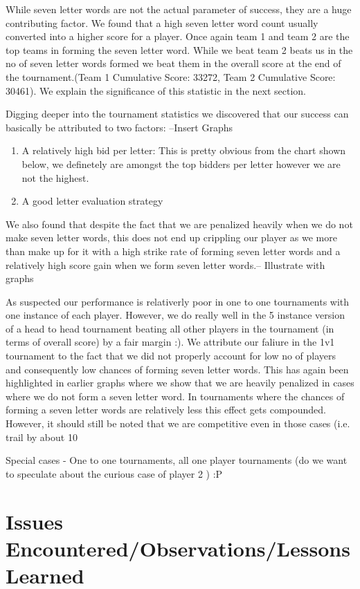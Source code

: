 \documentclass[11pt]{article}
\begin{document}
	While seven letter words are not the actual parameter of success, they are a huge contributing factor. We found that a high seven letter word count usually converted into a higher score for a player. Once again team 1 and team 2 are the top teams in forming the seven letter word. While we beat team 2 beats us in the no of seven letter words formed we beat them in the overall score at the end of the tournament.(Team 1 Cumulative Score: 33272, Team 2 Cumulative Score: 30461). We explain the significance of this statistic in the next section.
	
	
	Digging deeper into the tournament statistics we discovered that our success can basically be attributed to two factors:
	--Insert Graphs
	\begin{enumerate}
	\item{} A relatively high bid per letter: This is pretty obvious from the chart shown below, we definetely are amongst the top bidders per letter however we are not the highest.
	\item{} A good letter evaluation strategy
\end{enumerate}
	
	We also found that despite the fact that we are penalized heavily when we do not make seven letter words, this does not end up crippling our player as we more than make up for it with a high strike rate of forming seven letter words and a relatively high score gain when we form seven letter words.-- Illustrate with graphs
	
	As suspected our performance is relativerly poor in one to one tournaments with one instance of each player. However, we do really well in the 5 instance version of a head to head tournament beating all other players in the tournament (in terms of overall score) by a fair margin :). We attribute our faliure in the 1v1 tournament to the fact that we did not properly account for low no of players and consequently low chances of forming seven letter words. This has again been highlighted in earlier graphs where we show that we are heavily penalized in cases where we do not form a seven letter word. In tournaments where the chances of forming a seven letter words are relatively less this effect gets compounded. However, it should still be noted that we are competitive even in those cases (i.e. trail by about 10%
	
Special cases - One to one tournaments, all one player tournaments (do we want to speculate about the curious case of player 2 ) :P

\section{Issues Encountered/Observations/Lessons Learned}
\end{document}
